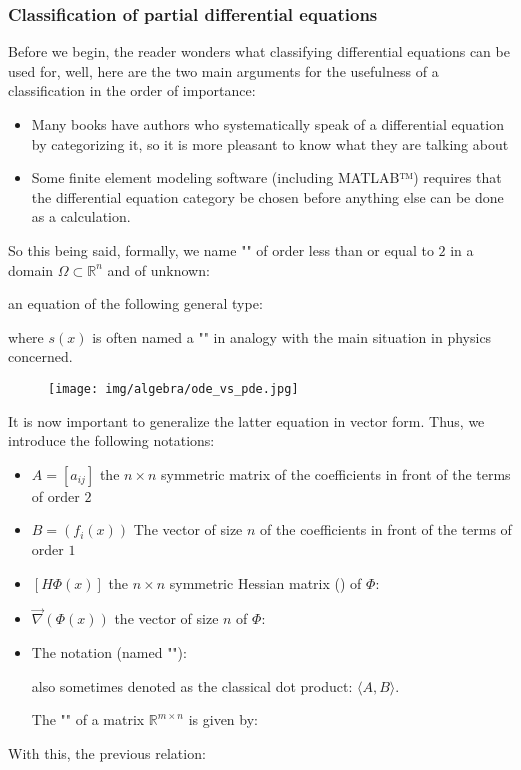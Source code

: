 	\subsubsection{Classification of partial differential equations}
	Before we begin, the reader wonders what classifying differential equations can be used for, well, here are the two main arguments for the usefulness of a classification in the order of importance:
	\begin{itemize}
		\item Many books have authors who systematically speak of a differential equation by categorizing it, so it is more pleasant to know what they are talking about

		\item Some finite element modeling software (including MATLAB™) requires that the differential equation category be chosen before anything else can be done as a calculation.
	\end{itemize}
	So this being said, formally, we name "" of order less than or equal to $2$ in a domain $\Omega \subset \mathbb{R}^n$ and of unknown:
	
	an equation of the following general type:
	
 	where $s(x)$ is often named a "" in analogy with the main situation in physics concerned.
	\begin{figure}[H]
		\centering
		\texttt{[image: img/algebra/ode\_vs\_pde.jpg]}
	\end{figure}
	It is now important to generalize the latter equation in vector form. Thus, we introduce the following notations:
	\begin{itemize}
		\item $A=[a_{ij}]$ the $n\times n$ symmetric matrix of the coefficients in front of the terms of order $2$

		\item $B=(f_i(x))$ The vector of size $n$ of the coefficients in front of the terms of order $1$

		\item $[H\Phi(x)]$ the $n\times n$ symmetric Hessian matrix () of $\Phi$:
		

		\item $\vec{\nabla}(\Phi(x))$ the vector of size $n$ of $\Phi$:
		

		\item The notation (named ""):
		
		also sometimes denoted as the classical dot product: $\langle A,B\rangle$.
		\begin{tcolorbox}[title=Remark,colframe=black,arc=10pt]
		The "" of a matrix $\mathbb{R}^{m\times n}$ is given by:
		
		\end{tcolorbox}
	\end{itemize}
	With this, the previous relation:
	
